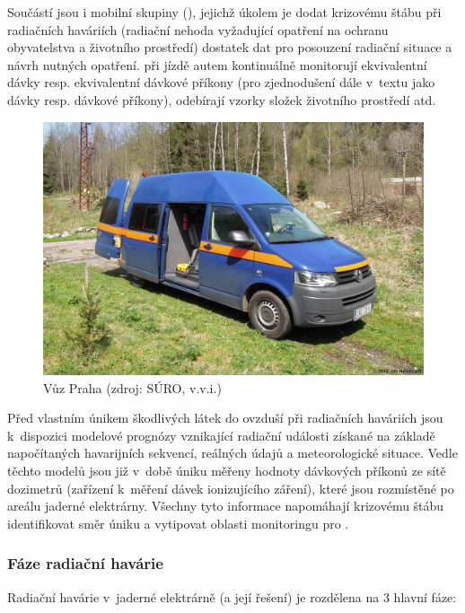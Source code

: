 Součástí  jsou i mobilní skupiny (), jejichž úkolem je dodat krizovému štábu při radiačních haváriích (radiační nehoda vyžadující opatření na ochranu obyvatelstva a životního prostředí) dostatek dat pro posouzení radiační situace a návrh nutných opatření.  při jízdě autem kontinuálně monitorují ekvivalentní dávky resp. ekvivalentní dávkové příkony (pro zjednodušení dále v~textu jako dávky resp. dávkové příkony), odebírají vzorky složek životního prostředí atd.  \cite{metodika} \cite{pecha2011monitorovani}

\begin{figure}[H]
    \centering
    \includegraphics[scale=0.6]{./pictures/vuzSURO.jpg}
      	\caption[Vůz   Praha]{Vůz   Praha (zdroj: SÚRO, v.v.i.)}
    	\label{fig:vuzSURO}
\end{figure} 

Před vlastním únikem škodlivých látek do ovzduší při radiačních haváriích jsou k~dispozici modelové prognózy vznikající radiační události získané na základě napočítaných havarijních sekvencí, reálných údajů a meteorologické situace. Vedle těchto modelů jsou již v~době úniku měřeny hodnoty dávkových příkonů ze sítě dozimetrů (zařízení k~měření dávek ionizujícího záření), které jsou rozmístěné po areálu jaderné elektrárny. Všechny tyto informace napomáhají krizovému štábu identifikovat směr úniku a vytipovat oblasti monitoringu pro . 

\subsubsection{Fáze radiační havárie}

Radiační havárie v~jaderné elektrárně (a její řešení) je rozdělena na 3 hlavní fáze:

